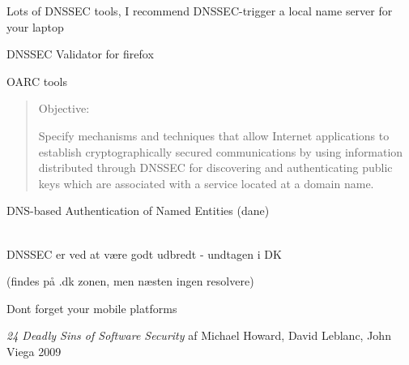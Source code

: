 \documentclass[20pt,landscape,a4paper,footrule]{foils}
\begin{document}
Lots of DNSSEC tools, I recommend DNSSEC-trigger a local name server for your laptop

\begin{list2}
\item DNSSEC Validator for firefox\\ 
\item OARC tools 
\item {}
\end{list2}



\begin{quote}
Objective:

Specify mechanisms and techniques that allow Internet applications to
establish cryptographically secured communications by using information
distributed through DNSSEC for discovering and authenticating public 
keys which are associated with a service located at a domain name.
\end{quote}

DNS-based Authentication of Named Entities (dane)\\
\\
{\footnotesize {}}

\vskip 2cm

\centerline{\Large DNSSEC er ved at være godt udbredt - undtagen i DK}
(findes på .dk zonen, men næsten ingen resolvere)

















\centerline{Dont forget your mobile platforms }



\emph{24 Deadly Sins of Software Security} af Michael Howard, David Leblanc, John Viega 2009
\end{document}
